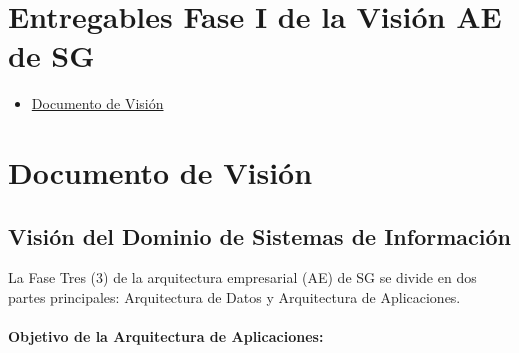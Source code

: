 \documentclass[
	a4paper, %
	12pt, %
]{include/CSSullivanBusinessReport}
\def\tightlist{}
\begin{document}
\newpage

\begin{twothirdswidth} %
	\tableofcontents %
\end{twothirdswidth}

\newpage


\section{Entregables Fase I de la Visión AE de
SG}\label{sec:entregables-fase-i-de-la-visiuxf3n-ae-de-sg}

\begin{itemize}
\tightlist
\item
  \hyperref[documento-de-visiuxf3n]{Documento de Visión}
\end{itemize}

\newpage

\section{Documento de Visión}\label{sec:documento-de-visiuxf3n}

\subsection{Visión del Dominio de Sistemas de
Información}\label{sec:visiuxf3n-del-dominio-de-sistemas-de-informaciuxf3n}

\begin{quote}
\end{quote}

La Fase Tres (3) de la arquitectura empresarial (AE) de SG se divide en
dos partes principales: Arquitectura de Datos y Arquitectura de
Aplicaciones.

\paragraph{Objetivo de la Arquitectura de
Aplicaciones:}\label{sec:objetivo-de-la-arquitectura-de-aplicaciones}
\end{document}
